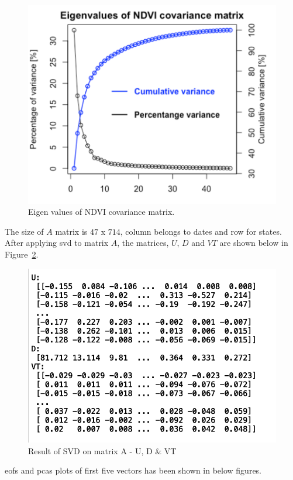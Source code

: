 \begin{figure}[H]
            \centering
            \includegraphics[width=0.70\linewidth]{figures/ch5/SVD/covarianceeigen.png}
            \caption{\label{fig:covriance} Eigen values of NDVI covariance matrix.}
    \end{figure}


The size of $A$ matrix is $47$ x $714$, column belongs to dates and row for states. After applying \gls{svd} to matrix $A$, the matrices, $U$, $D$ and $VT$ are shown below in Figure~\ref{fig:svd_result_matrices}.

    \begin{figure}[H]
            \centering
            \includegraphics[width=0.70\linewidth]{figures/ch5/svd_result_matrix.png}
            \caption{\label{fig:svd_result_matrices} Result of SVD on matrix A - U, D \& VT}
    \end{figure}
    
    \gls{eof}s and \gls{pca}s plots of first five vectors has been shown in below figures.
    
